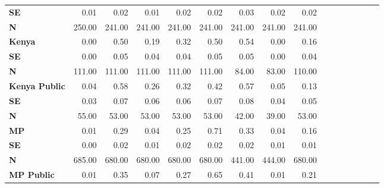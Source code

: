 \begin{tabular}{@{\extracolsep{5pt}}lrrrrrrrrrrrrrrr}
{\bf SE} & 0.01\phantom{***} & 0.02\phantom{***} & 0.01\phantom{***} & 0.02\phantom{***} & 0.02\phantom{***} & 0.03\phantom{***} & 0.02\phantom{***} & 0.02\phantom{***} \\
{\bf N} & 250.00\phantom{***} & 241.00\phantom{***} & 241.00\phantom{***} & 241.00\phantom{***} & 241.00\phantom{***} & 241.00\phantom{***} & 241.00\phantom{***} & 241.00\phantom{***} \\
{\bf Kenya} & 0.00\phantom{***} & 0.50\phantom{***} & 0.19\phantom{***} & 0.32\phantom{***} & 0.50\phantom{***} & 0.54\phantom{***} & 0.00\phantom{***} & 0.16\phantom{***} \\
{\bf SE} & 0.00\phantom{***} & 0.05\phantom{***} & 0.04\phantom{***} & 0.04\phantom{***} & 0.05\phantom{***} & 0.05\phantom{***} & 0.00\phantom{***} & 0.04\phantom{***} \\
{\bf N} & 111.00\phantom{***} & 111.00\phantom{***} & 111.00\phantom{***} & 111.00\phantom{***} & 111.00\phantom{***} & 84.00\phantom{***} & 83.00\phantom{***} & 110.00\phantom{***} \\
{\bf Kenya Public} & 0.04\phantom{***} & 0.58\phantom{***} & 0.26\phantom{***} & 0.32\phantom{***} & 0.42\phantom{***} & 0.57\phantom{***} & 0.05\phantom{***} & 0.13\phantom{***} \\
{\bf SE} & 0.03\phantom{***} & 0.07\phantom{***} & 0.06\phantom{***} & 0.06\phantom{***} & 0.07\phantom{***} & 0.08\phantom{***} & 0.04\phantom{***} & 0.05\phantom{***} \\
{\bf N} & 55.00\phantom{***} & 53.00\phantom{***} & 53.00\phantom{***} & 53.00\phantom{***} & 53.00\phantom{***} & 42.00\phantom{***} & 39.00\phantom{***} & 53.00\phantom{***} \\
{\bf MP} & 0.01\phantom{***} & 0.29\phantom{***} & 0.04\phantom{***} & 0.25\phantom{***} & 0.71\phantom{***} & 0.33\phantom{***} & 0.04\phantom{***} & 0.16\phantom{***} \\
{\bf SE} & 0.00\phantom{***} & 0.02\phantom{***} & 0.01\phantom{***} & 0.02\phantom{***} & 0.02\phantom{***} & 0.02\phantom{***} & 0.01\phantom{***} & 0.01\phantom{***} \\
{\bf N} & 685.00\phantom{***} & 680.00\phantom{***} & 680.00\phantom{***} & 680.00\phantom{***} & 680.00\phantom{***} & 441.00\phantom{***} & 444.00\phantom{***} & 680.00\phantom{***} \\
{\bf MP Public} & 0.01\phantom{***} & 0.35\phantom{***} & 0.07\phantom{***} & 0.27\phantom{***} & 0.65\phantom{***} & 0.41\phantom{***} & 0.01\phantom{***} & 0.21\phantom{***} \\

\end{tabular}
